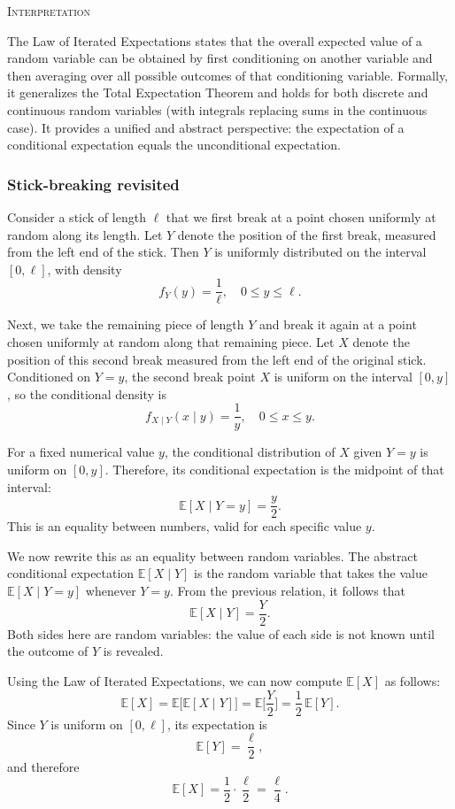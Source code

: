 \bigskip
\textsc{Interpretation}

The Law of Iterated Expectations states that the overall expected value of a random variable can be obtained by first conditioning on another variable and then averaging over all possible outcomes of that conditioning variable.  
Formally, it generalizes the Total Expectation Theorem and holds for both discrete and continuous random variables (with integrals replacing sums in the continuous case).  
It provides a unified and abstract perspective: the expectation of a conditional expectation equals the unconditional expectation.


\subsubsection{Stick-breaking revisited}

Consider a stick of length \(\ell\) that we first break at a point chosen uniformly at random along its length.  
Let \(Y\) denote the position of the first break, measured from the left end of the stick.  
Then \(Y\) is uniformly distributed on the interval \([0,\ell]\), with density
\[
f_Y(y) = \frac{1}{\ell},
\quad 0 \le y \le \ell.
\]

Next, we take the remaining piece of length \(Y\) and break it again at a point chosen uniformly at random along that remaining piece.  
Let \(X\) denote the position of this second break measured from the left end of the original stick.  
Conditioned on \(Y = y\), the second break point \(X\) is uniform on the interval \([0,y]\), so the conditional density is
\[
f_{X\mid Y}(x \mid y) = \frac{1}{y},
\quad 0 \le x \le y.
\]

For a fixed numerical value \(y\), the conditional distribution of \(X\) given \(Y = y\) is uniform on \([0,y]\).  
Therefore, its conditional expectation is the midpoint of that interval:
\[
\mathbb{E}[X \mid Y = y] = \frac{y}{2}.
\]
This is an equality between numbers, valid for each specific value \(y\).

We now rewrite this as an equality between random variables.  
The abstract conditional expectation \(\mathbb{E}[X \mid Y]\) is the random variable that takes the value \(\mathbb{E}[X \mid Y = y]\) whenever \(Y = y\).  
From the previous relation, it follows that
\[
\mathbb{E}[X \mid Y] = \frac{Y}{2}.
\]
Both sides here are random variables: the value of each side is not known until the outcome of \(Y\) is revealed.

Using the Law of Iterated Expectations, we can now compute \(\mathbb{E}[X]\) as follows:
\[
\mathbb{E}[X]
=
\mathbb{E}\big[\mathbb{E}[X \mid Y]\big]
=
\mathbb{E}\Big[\frac{Y}{2}\Big]
=
\frac{1}{2}\,\mathbb{E}[Y].
\]
Since \(Y\) is uniform on \([0,\ell]\), its expectation is
\[
\mathbb{E}[Y] = \frac{\ell}{2},
\]
and therefore
\[
\mathbb{E}[X] = \frac{1}{2} \cdot \frac{\ell}{2} = \frac{\ell}{4}.
\]

